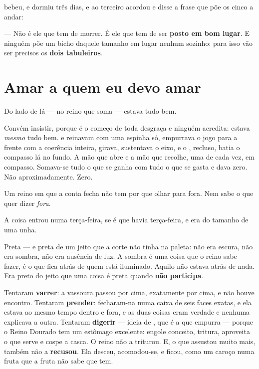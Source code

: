 \documentclass[livro.tex]{subfiles}
\begin{document}
\medskip

\Odo bebeu, e dormiu três dias, e ao terceiro acordou e disse a frase que põe os cinco a andar:

--- Não é ele que tem de morrer. É ele que tem de ser \textbf{posto em bom lugar}. E ninguém põe
um bicho daquele tamanho em lugar nenhum sozinho: para isso vão ser precisos os \textbf{dois
tabuleiros}.

\chapter{Amar a quem eu devo amar}

Do lado de lá --- no reino que soma --- estava tudo bem.

Convém insistir, porque é o começo de toda desgraça e ninguém acredita: estava \emph{mesmo} tudo
bem. \Ben e \Drk reinavam com uma espinha só, \Yas empurrava o jogo para a frente com a coerência
inteira, \Joa girava, \Lck sustentava o eixo, e o \Opr , recluso, batia o compasso lá no fundo.
A mão que abre e a mão que recolhe, uma de cada vez, em compasso. Somava-se tudo o que se ganha
com tudo o que se gasta e dava zero. Não aproximadamente. Zero.

Um reino em que a conta fecha não tem por que olhar para fora. Nem sabe o que quer dizer
\emph{fora}.

\medskip

A coisa entrou numa terça-feira, se é que havia terça-feira, e era do tamanho de uma unha.

Preta --- e preta de um jeito que a corte não tinha na paleta: não era escura, não era sombra,
não era ausência de luz. A sombra é uma coisa que o reino sabe fazer, é o que fica atrás de quem
está iluminado. Aquilo não estava atrás de nada. Era preto do jeito que uma coisa é preta quando
\textbf{não participa}.

Tentaram \textbf{varrer}: a vassoura passou por cima, exatamente por cima, e não houve encontro.
Tentaram \textbf{prender}: fecharam-na numa caixa de seis faces exatas, e ela estava ao mesmo
tempo dentro e fora, e as duas coisas eram verdade e nenhuma explicava a outra. Tentaram
\textbf{digerir} --- ideia de \Yas , que é a que empurra --- porque o Reino Dourado tem um
estômago excelente: engole conceito, tritura, aproveita o que serve e cospe a casca. O reino não
a triturou. E, o que assustou muito mais, também não a \textbf{recusou}. Ela desceu, acomodou-se,
e ficou, como um caroço numa fruta que a fruta não sabe que tem.
\end{document}
